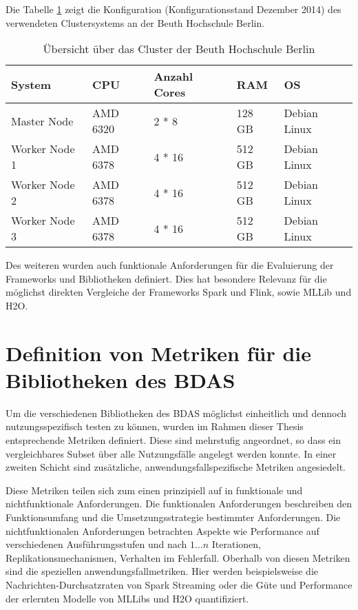 Die Tabelle \ref{tab:cluster} zeigt die Konfiguration (Konfigurationsstand Dezember 2014) des verwendeten Clustersystems an der Beuth Hochschule Berlin. 

\begin{table}[!ht]
\centering
\begin{tabular}{| p{3cm} | p{2.2cm} |  p{3cm} |  p{1.2cm} | p{3cm} | }
\hline
System & CPU & Anzahl Cores & RAM & OS\\ \hline \hline
Master Node & AMD 6320 & 2 * 8  & 128 GB & Debian Linux \\ \hline
Worker Node 1 & AMD 6378 & 4 * 16 & 512 GB &  Debian Linux\\ \hline
Worker Node 2 & AMD 6378 & 4 * 16 & 512 GB &  Debian Linux\\ \hline
Worker Node 3 & AMD 6378 & 4 * 16 & 512 GB &  Debian Linux\\ \hline

\end{tabular}
\caption{Übersicht über das Cluster der Beuth Hochschule Berlin}
	\label{tab:cluster}
\end{table}  

Des weiteren wurden auch funktionale Anforderungen für die Evaluierung der Frameworks und Bibliotheken definiert. Dies hat besondere Relevanz für die möglichst direkten Vergleiche der Frameworks Spark und Flink, sowie MLLib und H2O. 



\section{Definition von Metriken für die Bibliotheken des BDAS}
\label{section:definition der metriken}



Um die verschiedenen Bibliotheken des BDAS möglichst einheitlich und dennoch nutzungsspezifisch testen zu können, wurden im Rahmen dieser Thesis entsprechende Metriken definiert. Diese sind mehrstufig angeordnet, so dass ein vergleichbares Subset über alle Nutzungsfälle angelegt werden konnte. In einer zweiten Schicht sind zusätzliche, anwendungsfallspezifische Metriken angesiedelt. 

Diese Metriken teilen sich zum einen prinzipiell auf in funktionale und nichtfunktionale Anforderungen. Die funktionalen Anforderungen beschreiben den Funktionsumfang und die Umsetzungsstrategie bestimmter Anforderungen. Die nichtfunktionalen Anforderungen betrachten Aspekte wie Performance auf verschiedenen Ausführungsstufen und nach \(1...n\) Iterationen, Replikationsmechanismen, Verhalten im Fehlerfall. Oberhalb von diesen Metriken sind die speziellen anwendungsfallmetriken. Hier werden beispielsweise die Nachrichten-Durchsatzraten von Spark Streaming oder die Güte und Performance der erlernten Modelle von MLLibs und H2O quantifiziert.  



